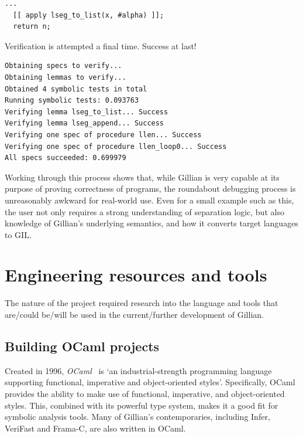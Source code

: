 \begin{lstlisting}[style=code, numbers=none, caption={Applying \texttt{lseg\_to\_list}}]
  ...
  [[ apply lseg_to_list(x, #alpha) ]];
  return n;
\end{lstlisting}

Verification is attempted a final time. Success at last!

\begin{lstlisting}[style=code, numbers=none, caption={Verification: WISL list length success}]
Obtaining specs to verify...
Obtaining lemmas to verify...
Obtained 4 symbolic tests in total
Running symbolic tests: 0.093763
Verifying lemma lseg_to_list... Success
Verifying lemma lseg_append... Success
Verifying one spec of procedure llen... Success
Verifying one spec of procedure llen_loop0... Success
All specs succeeded: 0.699979
\end{lstlisting}

Working through this process shows that, while Gillian is very capable at its purpose of proving correctness of programs, the roundabout debugging process is unreasonably awkward for real-world use. Even for a small example such as this, the user not only requires a strong understanding of separation logic, but also knowledge of Gillian's underlying semantics, and how it converts target languages to GIL.

\section{Engineering resources and tools}
\label{sec:background:engineering-tools}

The nature of the project required research into the language and tools that
are/could be/will be used in the current/further development of Gillian.

\subsection{Building OCaml projects}

Created in 1996, \textit{OCaml}~\cite{ocaml} is `an industrial-strength
programming language supporting functional, imperative and object-oriented
styles'. Specifically, OCaml provides the ability to make use of functional,
imperative, and object-oriented styles. This, combined with its powerful type
system, makes it a good fit for symbolic analysis tools. Many of Gillian's
contemporaries, including Infer, VeriFast and Frama-C, are also written in OCaml.

